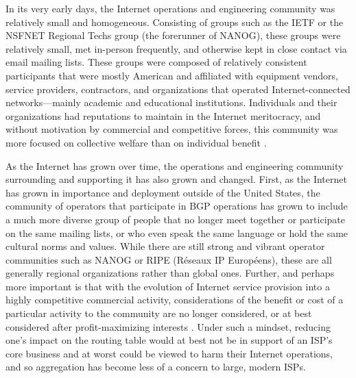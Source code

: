 In its very early days, the Internet operations and engineering community was
relatively small and homogeneous. Consisting of groups such as the IETF or the
NSFNET Regional Techs group (the forerunner of NANOG), these groups were
relatively small, met in-person frequently, and otherwise kept in close contact
via email mailing lists. These groups were composed of relatively consistent
participants that were mostly American and affiliated with equipment vendors,
service providers, contractors, and organizations that operated
Internet-connected networks---mainly academic and educational institutions.
Individuals and their organizations had reputations to maintain in the Internet
meritocracy, and without motivation by commercial and competitive forces, this
community was more focused on collective welfare than on individual benefit
\cite{Li:2011vn}.

As the Internet has grown over time, the operations and engineering community
surrounding and supporting it has also grown and changed. First, as the
Internet has grown in importance and deployment outside of the United States,
the community of operators that participate in BGP operations has grown to
include a much more diverse group of people that no longer meet together or
participate on the same mailing lists, or who even speak the same language or
hold the same cultural norms and values. While there are still strong and
vibrant operator communities such as NANOG or RIPE (R\'{e}seaux IP
Europ\'{e}ens), these are all generally regional organizations rather than
global ones. Further, and perhaps more important is that with the evolution of
Internet service provision into a highly competitive commercial activity,
considerations of the benefit or cost of a particular activity to the community
are no longer considered, or at best considered after profit-maximizing
interests \cite{Li:2011vn}. Under such a mindset, reducing one's impact on the
routing table would at best not be in support of an ISP's core business and at
worst could be viewed to harm their Internet operations, and so aggregation has
become less of a concern to large, modern ISPs.



